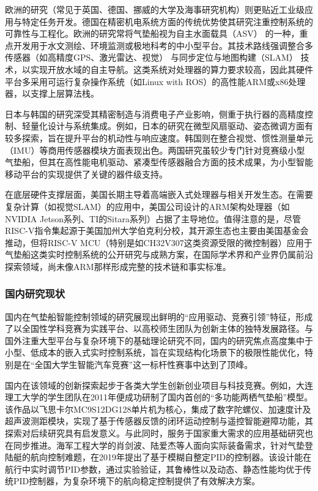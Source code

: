 欧洲的研究（常见于英国、德国、挪威的大学及海事研究机构）则更贴近工业级应用与特定任务开发。德国在精密机电系统方面的传统优势使其研究注重控制系统的可靠性与工程化。欧洲的研究常将气垫船视为自主水面载具（ASV） 的一种，重点开发用于水文测绘、环境监测或极地科考的中小型平台。其技术路线强调整合多传感器（如高精度GPS、激光雷达、视觉） 与同步定位与地图构建（SLAM） 技术，以实现开放水域的自主导航。这类系统对处理器的算力要求较高，因此其硬件平台多采用可运行复杂操作系统（如Linux with ROS）的高性能ARM或x86处理器，以支撑上层算法栈。

日本与韩国的研究深受其精密制造与消费电子产业影响，侧重于执行器的高精度控制、轻量化设计与系统集成。例如，日本的研究在微型风扇驱动、姿态微调方面有较多探索，旨在提升平台的机动性与响应速度。韩国则在整合视觉、惯性测量单元（IMU）等商用传感器模块方面表现出色。两国研究虽较少专门针对竞赛级小型气垫船，但其在高性能电机驱动、紧凑型传感器融合方面的技术成果，为小型智能移动平台的实现提供了关键的器件级支持。

在底层硬件支撑层面，美国长期主导着高端嵌入式处理器与相关开发生态。在需要复杂计算（如视觉SLAM）的应用中，美国公司设计的ARM架构处理器（如NVIDIA Jetson系列、TI的Sitara系列）占据了主导地位。值得注意的是，尽管RISC-V指令集起源于美国加州大学伯克利分校，其开源生态也主要由美国基金会推动，但将RISC-V MCU（特别是如CH32V307这类资源受限的微控制器）应用于气垫船这类实时控制系统的公开研究与成熟方案，在国际学术界和产业界仍属前沿探索领域，尚未像ARM那样形成完整的技术链和事实标准。
\subsubsection{国内研究现状}
国内在气垫船智能控制领域的研究展现出鲜明的“应用驱动、竞赛引领”特征，形成了以全国性学科竞赛为实践平台、以高校师生团队为创新主体的独特发展路径。与国外注重大型平台与复杂环境下的基础理论研究不同，国内的研究焦点高度集中于小型、低成本的嵌入式实时控制系统，旨在实现结构化场景下的极限性能优化，特别是在“全国大学生智能汽车竞赛”这一标杆性赛事中达到了顶峰。

国内在该领域的创新探索起步于各类大学生创新创业项目与科技竞赛。例如，大连理工大学的学生团队在2011年便成功研制了国内首创的“多功能两栖气垫船”模型。该作品以飞思卡尔MC9S12DG128单片机为核心，集成了数字陀螺仪、加速度计及超声波测距模块，实现了基于传感器反馈的闭环运动控制与遥控智能避障功能，其探索对后续研究具有启发意义。与此同时，服务于国家重大需求的应用基础研究也在同步推进。海军工程大学的肖剑波、陆爱杰等人面向实际装备需求，针对气垫登陆艇的航向控制难题，在2019年提出了基于模糊自整定PID的控制器。该设计能在航行中实时调节PID参数，通过实验验证，其鲁棒性以及动态、静态性能均优于传统PID控制器，为复杂环境下的航向稳定控制提供了有效解决方案。

